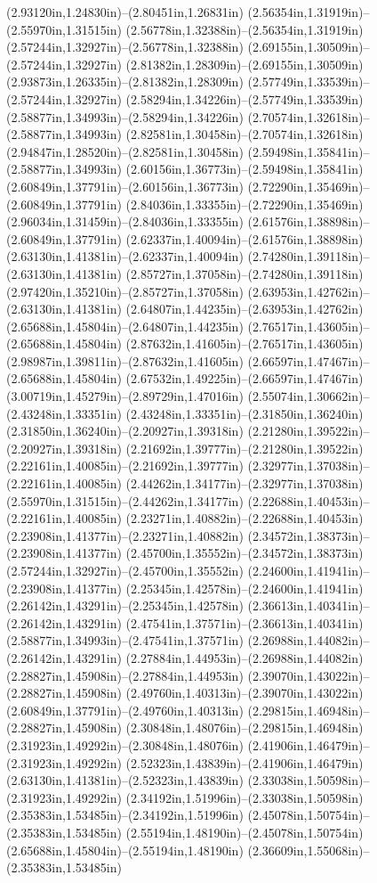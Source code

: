 (2.93120in,1.24830in)--(2.80451in,1.26831in) (2.56354in,1.31919in)--(2.55970in,1.31515in) (2.56778in,1.32388in)--(2.56354in,1.31919in) (2.57244in,1.32927in)--(2.56778in,1.32388in) (2.69155in,1.30509in)--(2.57244in,1.32927in) (2.81382in,1.28309in)--(2.69155in,1.30509in) (2.93873in,1.26335in)--(2.81382in,1.28309in) (2.57749in,1.33539in)--(2.57244in,1.32927in) (2.58294in,1.34226in)--(2.57749in,1.33539in) (2.58877in,1.34993in)--(2.58294in,1.34226in) (2.70574in,1.32618in)--(2.58877in,1.34993in) (2.82581in,1.30458in)--(2.70574in,1.32618in) (2.94847in,1.28520in)--(2.82581in,1.30458in) (2.59498in,1.35841in)--(2.58877in,1.34993in) (2.60156in,1.36773in)--(2.59498in,1.35841in) (2.60849in,1.37791in)--(2.60156in,1.36773in) (2.72290in,1.35469in)--(2.60849in,1.37791in) (2.84036in,1.33355in)--(2.72290in,1.35469in) (2.96034in,1.31459in)--(2.84036in,1.33355in) (2.61576in,1.38898in)--(2.60849in,1.37791in) (2.62337in,1.40094in)--(2.61576in,1.38898in) (2.63130in,1.41381in)--(2.62337in,1.40094in) (2.74280in,1.39118in)--(2.63130in,1.41381in) (2.85727in,1.37058in)--(2.74280in,1.39118in) (2.97420in,1.35210in)--(2.85727in,1.37058in) (2.63953in,1.42762in)--(2.63130in,1.41381in) (2.64807in,1.44235in)--(2.63953in,1.42762in) (2.65688in,1.45804in)--(2.64807in,1.44235in) (2.76517in,1.43605in)--(2.65688in,1.45804in) (2.87632in,1.41605in)--(2.76517in,1.43605in) (2.98987in,1.39811in)--(2.87632in,1.41605in) (2.66597in,1.47467in)--(2.65688in,1.45804in) (2.67532in,1.49225in)--(2.66597in,1.47467in) (3.00719in,1.45279in)--(2.89729in,1.47016in) (2.55074in,1.30662in)--(2.43248in,1.33351in) (2.43248in,1.33351in)--(2.31850in,1.36240in) (2.31850in,1.36240in)--(2.20927in,1.39318in) (2.21280in,1.39522in)--(2.20927in,1.39318in) (2.21692in,1.39777in)--(2.21280in,1.39522in) (2.22161in,1.40085in)--(2.21692in,1.39777in) (2.32977in,1.37038in)--(2.22161in,1.40085in) (2.44262in,1.34177in)--(2.32977in,1.37038in) (2.55970in,1.31515in)--(2.44262in,1.34177in) (2.22688in,1.40453in)--(2.22161in,1.40085in) (2.23271in,1.40882in)--(2.22688in,1.40453in) (2.23908in,1.41377in)--(2.23271in,1.40882in) (2.34572in,1.38373in)--(2.23908in,1.41377in) (2.45700in,1.35552in)--(2.34572in,1.38373in) (2.57244in,1.32927in)--(2.45700in,1.35552in) (2.24600in,1.41941in)--(2.23908in,1.41377in) (2.25345in,1.42578in)--(2.24600in,1.41941in) (2.26142in,1.43291in)--(2.25345in,1.42578in) (2.36613in,1.40341in)--(2.26142in,1.43291in) (2.47541in,1.37571in)--(2.36613in,1.40341in) (2.58877in,1.34993in)--(2.47541in,1.37571in) (2.26988in,1.44082in)--(2.26142in,1.43291in) (2.27884in,1.44953in)--(2.26988in,1.44082in) (2.28827in,1.45908in)--(2.27884in,1.44953in) (2.39070in,1.43022in)--(2.28827in,1.45908in) (2.49760in,1.40313in)--(2.39070in,1.43022in) (2.60849in,1.37791in)--(2.49760in,1.40313in) (2.29815in,1.46948in)--(2.28827in,1.45908in) (2.30848in,1.48076in)--(2.29815in,1.46948in) (2.31923in,1.49292in)--(2.30848in,1.48076in) (2.41906in,1.46479in)--(2.31923in,1.49292in) (2.52323in,1.43839in)--(2.41906in,1.46479in) (2.63130in,1.41381in)--(2.52323in,1.43839in) (2.33038in,1.50598in)--(2.31923in,1.49292in) (2.34192in,1.51996in)--(2.33038in,1.50598in) (2.35383in,1.53485in)--(2.34192in,1.51996in) (2.45078in,1.50754in)--(2.35383in,1.53485in) (2.55194in,1.48190in)--(2.45078in,1.50754in) (2.65688in,1.45804in)--(2.55194in,1.48190in) (2.36609in,1.55068in)--(2.35383in,1.53485in) 